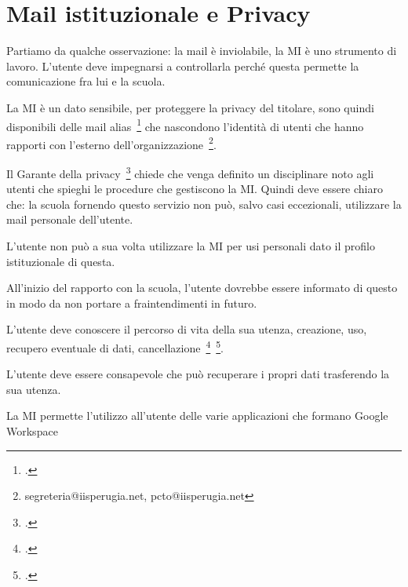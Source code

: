 \section{Mail istituzionale e Privacy}
Partiamo da qualche osservazione: la mail è inviolabile, la 
MI è uno strumento di lavoro. L'utente deve impegnarsi a controllarla perché questa permette la comunicazione fra lui e la scuola. 

La MI è 
un dato sensibile, per proteggere la privacy del titolare,  sono quindi 
disponibili delle mail alias~\footcite{Garante2007} che nascondono l'identità di utenti 
che  hanno rapporti 
con l'esterno dell'organizzazione~\footnote{segreteria@iisperugia.net, pcto@iisperugia.net}. 

Il Garante della privacy~\footcite{Garante2007} chiede che 
venga definito un disciplinare noto agli utenti che spieghi le procedure che gestiscono la MI. Quindi deve essere chiaro che:
la scuola fornendo questo servizio non può, salvo casi eccezionali, utilizzare 
la mail personale dell'utente.

L'utente non può a sua volta utilizzare la MI per  usi  
personali dato il profilo istituzionale di questa. 

 All'inizio del rapporto con la scuola, l'utente dovrebbe essere informato di questo 
in modo da non portare a fraintendimenti in futuro.

L'utente deve conoscere il percorso di vita della sua utenza, creazione, uso, 
recupero eventuale di dati, 
cancellazione~\footcite{Garante2007}~\footcite{Garante2019}. 

L'utente deve 
essere consapevole che 
può recuperare i propri dati trasferendo  la sua utenza. 

La MI permette l'utilizzo all'utente delle varie applicazioni che formano \textenglish{Google Workspace}